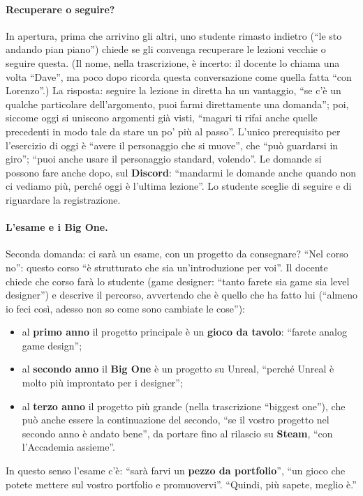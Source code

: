 \paragraph{Recuperare o seguire?} In apertura, prima che arrivino gli altri, uno
studente rimasto indietro (``le sto andando pian piano'') chiede se gli convenga
recuperare le lezioni vecchie o seguire questa. (Il nome, nella trascrizione, è incerto:
il docente lo chiama una volta ``Dave'', ma poco dopo ricorda questa conversazione come
quella fatta ``con Lorenzo''.) La risposta: seguire la lezione in diretta ha un vantaggio,
``se c'è un qualche particolare dell'argomento, puoi farmi direttamente una domanda''; poi,
siccome oggi si uniscono argomenti già visti, ``magari ti rifai anche quelle precedenti in
modo tale da stare un po' più al passo''. L'unico prerequisito per l'esercizio di oggi è
``avere il personaggio che si muove'', che ``può guardarsi in giro''; ``puoi anche usare
il personaggio standard, volendo''. Le domande si possono fare anche dopo, sul
\textbf{Discord}: ``mandarmi le domande anche quando non ci vediamo più, perché oggi è
l'ultima lezione''. Lo studente sceglie di seguire e di riguardare la registrazione.

\paragraph{L'esame e i Big One.} Seconda domanda: ci sarà un esame, con un progetto da
consegnare? ``Nel corso no'': questo corso ``è strutturato che sia un'introduzione per
voi''. Il docente chiede che corso farà lo studente (game designer: ``tanto farete sia game
sia level designer'') e descrive il percorso, avvertendo che è quello che ha fatto lui
(``almeno io feci così, adesso non so come sono cambiate le cose''):
\begin{itemize}
  \item al \textbf{primo anno} il progetto principale è un \textbf{gioco da tavolo}:
        ``farete analog game design'';
  \item al \textbf{secondo anno} il \textbf{Big One} è un progetto su Unreal, ``perché
        Unreal è molto più improntato per i designer'';
  \item al \textbf{terzo anno} il progetto più grande (nella trascrizione ``biggest one''),
        che può anche essere la continuazione del secondo, ``se il vostro progetto nel
        secondo anno è andato bene'', da portare fino al rilascio su \textbf{Steam},
        ``con l'Accademia assieme''.
\end{itemize}
In questo senso l'esame c'è: ``sarà farvi un \textbf{pezzo da portfolio}'', ``un gioco che
potete mettere sul vostro portfolio e promuovervi''. ``Quindi, più sapete, meglio è.''

